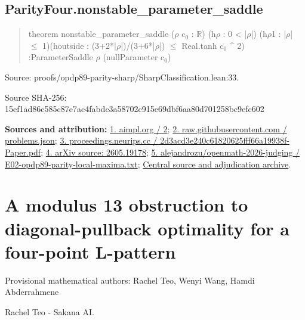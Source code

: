 \documentclass[11pt,a4paper]{article}
\begin{document}
\begin{samepage}
\subsection{ParityFour.nonstable\_parameter\_saddle}
\begin{quote}\small\ttfamily theorem nonstable\_parameter\_saddle (\ensuremath{\rho} c\ensuremath{_0} : \ensuremath{\mathbb{R}}) (h\ensuremath{\rho} : 0 < |\ensuremath{\rho}|) (h\ensuremath{\rho}1 : |\ensuremath{\rho}| \ensuremath{\leq} 1)\newline     (houtside : (3+2*|\ensuremath{\rho}|)/(3+6*|\ensuremath{\rho}|) \ensuremath{\leq} Real.tanh c\ensuremath{_0} \textasciicircum{} 2) :\newline     ParameterSaddle \ensuremath{\rho} (nullParameter c\ensuremath{_0})\end{quote}
{\small Source: proofs/opdp89-parity-sharp/SharpClassification.lean:33.\par}

{\small Source SHA-256: 15ef1ad86c585c87e7ac4fabdc3a58702c915e69dbf6aa80d701258bc9efc602\par}

{\small\textbf{Sources and attribution:} \href{http://aimpl.org/boltzmann/2/}{1. aimpl.org / 2}; \href{https://raw.githubusercontent.com/alejandrozu/opdp-week-math-100/main/data/problems.json}{2. raw.githubusercontent.com / problems.json}; \href{https://proceedings.neurips.cc/paper_files/paper/2002/file/2d3acd3e240c61820625fff66a19938f-Paper.pdf}{3. proceedings.neurips.cc / 2d3acd3e240c61820625fff66a19938f-Paper.pdf}; \href{https://arxiv.org/html/2605.19178}{4. arXiv source: 2605.19178}; \href{https://github.com/alejandrozu/openmath-2026-judging/blob/d0ed487f487fa7ec814ff705ab55249983fe8707/OpenMath-Judging/review/entries/E02-opdp89-parity-local-maxima.txt}{5. alejandrozu/openmath-2026-judging / E02-opdp89-parity-local-maxima.txt}; \href{https://github.com/alejandrozu/openmath-2026-judging}{Central source and adjudication archive}.\par}

\end{samepage}
\clearpage
\section{A modulus 13 obstruction to diagonal-pullback optimality for a four-point L-pattern}
{\small Provisional mathematical authors: Rachel Teo, Wenyi Wang, Hamdi Abderrahmene\par}\medskip
{\small Rachel Teo  -  Sakana AI.\par}
\end{document}
